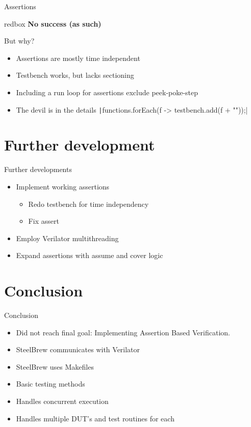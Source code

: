 \documentclass[aspectratio=169, handout]{beamer}
\begin{document}
\begin{frame}[containsverbatim]{Assertions}
    \begin{beamercolorbox}[sep=2em]{redbox}
        \textbf{No success (as such)}
    \end{beamercolorbox}
    But why?
    \begin{itemize}
        \item Assertions are mostly time independent
        \item Testbench works, but lacks sectioning
        \item Including a run loop for assertions exclude peek-poke-step
        \item The devil is in the details \texttt|functions.forEach(f -> testbench.add(f + "\n"));|
    \end{itemize}
\end{frame}
\section{Further development}
\begin{frame}{Further developments}
    \begin{itemize}
        \item Implement working assertions
              \begin{itemize}
                  \item Redo testbench for time independency \faCheckCircle
                  \item Fix assert \faCheckCircle
              \end{itemize}
        \item Employ Verilator multithreading \faTimesCircle
        \item Expand assertions with assume and cover logic \faTimesCircle
    \end{itemize}
\end{frame}
\section{Conclusion}
\begin{frame}{Conclusion}
    \begin{itemize}
        \item Did not reach final goal: Implementing Assertion Based Verification.
        \item SteelBrew communicates with Verilator
        \item SteelBrew uses Makefiles
        \item Basic testing methods
        \item Handles concurrent execution
        \item Handles multiple DUT's and test routines for each
    \end{itemize}
\end{frame}
\end{document}
